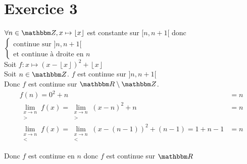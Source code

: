 \part{Exercice 3}
$\forall n \in \Z, x \mapsto \left\lfloor x \right\rfloor$ est constante sur $[n,n+1[$ donc $\begin{cases}
	\text{continue sur } ]n,n+1[\\
	\text{et continue à droite en } n
\end{cases}$ \\
Soit $f: x \mapsto \left( x - \left\lfloor x \right\rfloor  \right) ^2 + \left\lfloor x \right\rfloor $ \\
Soit $n \in \Z$. $f$ est continue sur $]n,n+1[$\\
Donc $f$ est continue sur $\R\setminus\Z$.\\
\begin{align*}
	f(n) = 0^2 + n &= n\\
	\lim_{\substack{x\to n\\>}}f(x) = \lim_{\substack{x\to n\\>}}(x-n)^2+n &= n\\
	\lim_{\substack{x \to n\\<}} f(x) = \lim_{\substack{x \to n\\<}}\left( x-(n-1) \right) ^2+(n-1) = 1 + n -1 &= n
\end{align*}

Donc $f$ est continue en $n$ donc $f$ est continue sur $\R$
